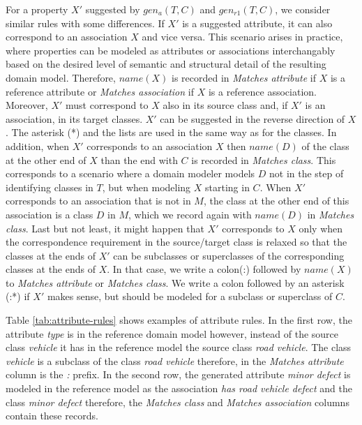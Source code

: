 For a property $X'$ suggested by $gen_a(T,C)$ and $gen_{r1}(T,C)$, we consider similar rules with some differences.
If $X'$ is a suggested attribute, it can also correspond to an association $X$ and vice versa.
This scenario arises in practice, where properties can be modeled as attributes or associations interchangably based on the desired level of semantic and structural detail of the resulting domain model.
Therefore, $name(X)$ is recorded in \emph{Matches attribute} if $X$ is a reference attribute or \emph{Matches association} if $X$ is a reference association.
Moreover, $X'$ must correspond to $X$ also in its source class and, if $X'$ is an association, in its target classes.
$X'$ can be suggested in the reverse direction of $X$.
The asterisk (*) and the lists are used in the same way as for the classes.
In addition, when $X'$ corresponds to an association $X$ then $name(D)$ of the class at the other end of $X$ than the end with $C$ is recorded in \emph{Matches class}.
This corresponds to a scenario where a domain modeler models $D$ not in the step of identifying classes in $T$, but when modeling $X$ starting in $C$.
When $X'$ corresponds to an association that is not in $M$, the class at the other end of this association is a class $D$ in $M$, which we record again with $name(D)$ in \emph{Matches class}.
Last but not least, it might happen that $X'$ corresponds to $X$ only when the correspondence requirement in the source/target class is relaxed so that the classes at the ends of $X'$ can be subclasses or superclasses of the corresponding classes at the ends of $X$.
In that case, we write a colon(:) followed by $name(X)$ to \emph{Matches attribute} or \emph{Matches class}.
We write a colon followed by an asterisk (:*) if $X'$ makes sense, but should be modeled for a subclass or superclass of $C$.

Table \ref{tab:attribute-rules} shows examples of attribute rules. In the first row, the attribute \textit{type} is in the reference domain model however, instead of the source class \textit{vehicle} it has in the reference model the source class \textit{road vehicle}. The class \textit{vehicle} is a subclass of the class \textit{road vehicle} therefore, in the \textit{Matches attribute} column is the \textit{:} prefix. In the second row, the generated attribute \textit{minor defect} is modeled in the reference model as the association \textit{has road vehicle defect} and the class \textit{minor defect} therefore, the \textit{Matches class} and \textit{Matches association} columns contain these records.


